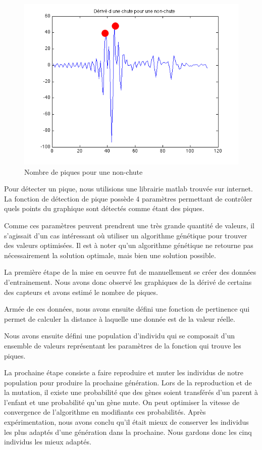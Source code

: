 \documentclass[12pt,letterpaper]{article}
\begin{document}
\begin{figure}[htp]
\centering
\includegraphics[scale=0.5]{images/piques_nonchute.png}
\caption{Nombre de piques pour une non-chute}
\label{fig:nonchute}
\end{figure}


Pour détecter un pique, nous utilisions une librairie matlab trouvée sur internet. La fonction de détection de pique
possède 4 paramètres permettant de contrôler quels points du graphique sont détectés comme étant des piques.

Comme ces paramètres peuvent prendrent une très grande quantité de valeurs, il s'agissait d'un cas intéressant où utiliser
un algorithme génétique pour trouver des valeurs optimisées. Il est à noter qu'un algorithme génétique ne retourne pas
nécessairement la solution optimale, mais bien une solution possible.

La première étape de la mise en oeuvre fut de manuellement se créer des données d'entrainement. Nous avons donc
observé les graphiques de la dérivé de certains des capteurs et avons estimé le nombre de piques.

Armée de ces données, nous avons ensuite défini une fonction de pertinence qui permet de calculer la distance à laquelle
une donnée est de la valeur réelle.

Nous avons ensuite défini une population d'individu qui se composait d'un ensemble de valeurs représentant les paramètres de la fonction qui trouve les piques.

La prochaine étape consiste a faire reproduire et muter les individus de notre population pour produire la prochaine génération.
Lors de la reproduction et de la mutation, il existe une probabilité que des gènes soient transférés d'un parent à l'enfant et une
probabilité qu'un gène mute. On peut optimiser la vitesse de convergence de l'algorithme en modifiants ces probabilités. Après
expérimentation, nous avons conclu qu'il était mieux de conserver les individus les plus adaptés d'une génération dans la prochaine.
Nous gardons donc les cinq individus les mieux adaptés.
\end{document}
